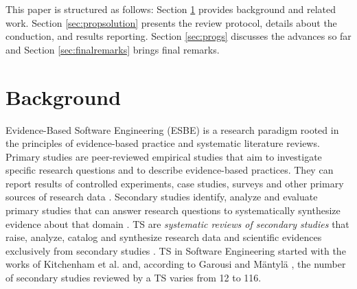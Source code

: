 \documentclass[sigconf]{acmart}
\begin{document}
This paper is structured as follows: Section \ref{sec:background} provides background and related work. Section \ref{sec:propsolution} presents the review protocol, details about the conduction, and results reporting. %
Section \ref{sec:progs} discusses the advances so far and Section \ref{sec:finalremarks} brings final remarks.
\vspace{-0.3cm}

\section{Background}
\label{sec:background}

Evidence-Based Software Engineering (ESBE) is a research paradigm 
rooted in the principles of evidence-based practice and systematic literature reviews. 
Primary studies are peer-reviewed empirical studies that aim to investigate specific research questions and to describe evidence-based practices. They can report results of controlled experiments, case studies, surveys and other primary sources of research data \cite{Kitchenham2007, Petticrew2005}. Secondary studies identify, analyze and evaluate primary studies that can answer research questions to systematically synthesize evidence about that domain \cite{Kitchenham2004}. 
TS are \textit{systematic reviews of secondary studies} that raise, analyze, catalog and synthesize research data and scientific evidences exclusively from secondary studies \cite{Kitchenham2007}. TS in Software Engineering started with the works of Kitchenham et al. \cite{KITCHENHAM2009,KITCHENHAM2010} and, according to Garousi and Mäntylä \cite{Garousi2016}, the number of secondary studies reviewed by a TS varies from 12 to 116. %
\end{document}
